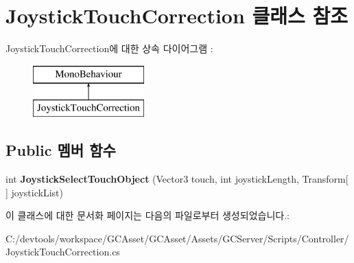 \hypertarget{class_joystick_touch_correction}{}\section{Joystick\+Touch\+Correction 클래스 참조}
\label{class_joystick_touch_correction}
Joystick\+Touch\+Correction에 대한 상속 다이어그램 \+: \begin{figure}[H]
\begin{center}
\leavevmode
\includegraphics[height=2.000000cm]{class_joystick_touch_correction}
\end{center}
\end{figure}
\subsection*{Public 멤버 함수}
\begin{DoxyCompactItemize}
\item 
\hypertarget{class_joystick_touch_correction_acdd2b3d29c6ec22995f85d4a01679ae5}{}int {\bfseries Joystick\+Select\+Touch\+Object} (Vector3 touch, int joystick\+Length, Transform\mbox{[}$\,$\mbox{]} joystick\+List)\label{class_joystick_touch_correction_acdd2b3d29c6ec22995f85d4a01679ae5}

\end{DoxyCompactItemize}


이 클래스에 대한 문서화 페이지는 다음의 파일로부터 생성되었습니다.\+:\begin{DoxyCompactItemize}
\item 
C\+:/devtools/workspace/\+G\+C\+Asset/\+G\+C\+Asset/\+Assets/\+G\+C\+Server/\+Scripts/\+Controller/Joystick\+Touch\+Correction.\+cs\end{DoxyCompactItemize}
